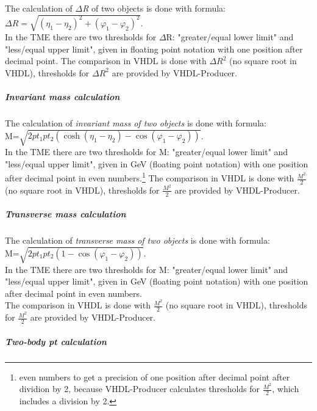 The calculation of \textit{$\Delta$R} of two objects is done with formula:\\ 

$\Delta$$R=\sqrt{(\eta_1-\eta_2)^2+(\varphi_1-\varphi_2)^2}$.\\

In the TME there are two thresholds for $\Delta$R: "greater/equal lower limit" and "less/equal upper limit", given in floating point notation
with one position after decimal point.
The comparison in VHDL is done with $\Delta$$R^2$ (no square root in VHDL), thresholds for $\Delta$$R^2$ are provided by VHDL-Producer.

\subparagraph{Invariant mass calculation}
\label{sec:gtl:inv_mass_calculation}

The calculation of \textit{invariant mass of two objects} is done with formula:\\

M=$\sqrt{2 pt_1  pt_2 (\cosh(\eta_1-\eta_2)-\cos(\varphi_1-\varphi_2))}$.\\

In the TME there are two thresholds for M: "greater/equal lower limit" and "less/equal upper limit", given in GeV (floating point notation) with one position after decimal point in even numbers.\footnote{even numbers to get a precision of one position after decimal point after dividion by 2, because VHDL-Producer calculates thresholds for $\frac{M^2}{2}$, which includes a division by 2.}
The comparison in VHDL is done with $\frac{M^2}{2}$ (no square root in VHDL), thresholds for $\frac{M^2}{2}$ are provided by VHDL-Producer.

\subparagraph{Transverse mass calculation}
\label{sec:gtl:transverse_mass_calculation}

The calculation of \textit{transverse mass of two objects} is done with formula:\\

M=$\sqrt{2 pt_1 pt_2 (1-\cos(\varphi_1-\varphi_2))}$.\\

In the TME there are two thresholds for M: "greater/equal lower limit" and "less/equal upper limit", given in GeV (floating point notation) with one position after decimal point in even numbers.\\
The comparison in VHDL is done with $\frac{M^2}{2}$ (no square root in VHDL), thresholds for $\frac{M^2}{2}$ are provided by VHDL-Producer.

\subparagraph{Two-body pt calculation}
\label{sec:gtl:twobody_pt_calculation}


